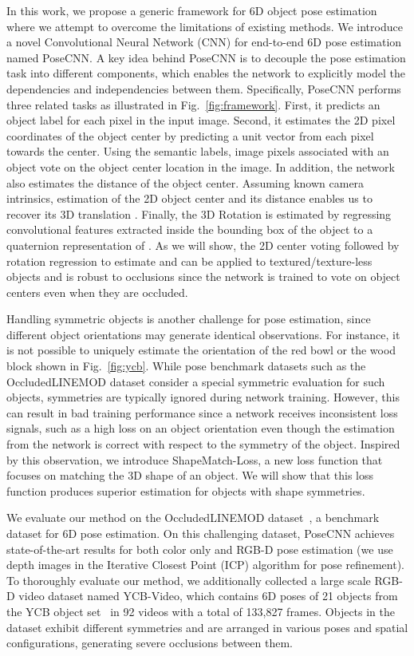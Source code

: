 \documentclass[conference]{IEEEtran}
\begin{document}
In this work, we propose a generic framework for 6D object pose estimation where we attempt to overcome the limitations of existing methods. We introduce a novel Convolutional Neural Network (CNN) for end-to-end 6D pose estimation named PoseCNN. A key idea behind PoseCNN is to decouple the pose estimation task into different components, which enables the network to explicitly model the dependencies and independencies between them. Specifically, PoseCNN performs three related tasks as illustrated in Fig.~\ref{fig:framework}. First, it predicts an object label for each pixel in the input image. Second, it estimates the 2D pixel coordinates of the object center by predicting a unit vector from each pixel towards the center. Using the semantic labels, image pixels associated with an object vote on the object center location in the image. In addition, the network also estimates the distance of the object center. Assuming known camera intrinsics, estimation of the 2D object center and its distance enables us to recover its 3D translation . Finally, the 3D Rotation  is estimated by regressing convolutional features extracted inside the bounding box of the object to a quaternion representation of . As we will show, the 2D center voting followed by rotation regression to estimate  and  can be applied to textured/texture-less objects and is robust to occlusions since the network is trained to vote on object centers even when they are occluded.

Handling symmetric objects is another challenge for pose estimation, since different object orientations may generate identical observations. For instance, it is not possible to uniquely estimate the orientation of the red bowl or the wood block shown in Fig.~\ref{fig:ycb}. While pose benchmark datasets such as the OccludedLINEMOD dataset \cite{krull2015learning} consider a special symmetric evaluation for such objects, symmetries are typically ignored during network training. However, this can result in bad training performance since a network receives inconsistent loss signals, such as a high loss on an object orientation even though the estimation from the network is correct with respect to the symmetry of the object. Inspired by this observation, we introduce ShapeMatch-Loss, a new loss function that focuses on matching the 3D shape of an object. We will show that this loss function produces superior estimation for objects with shape symmetries.

We evaluate our method on the OccludedLINEMOD dataset~\cite{krull2015learning}, a benchmark dataset for 6D pose estimation.  On this challenging dataset, PoseCNN achieves state-of-the-art results for both color only  and RGB-D pose estimation (we use depth images in the Iterative Closest Point (ICP) algorithm for pose refinement). To thoroughly evaluate our method, we additionally collected a large scale RGB-D video dataset named YCB-Video, which contains 6D poses of 21 objects from the YCB object set~\cite{calli2015ycb} in 92 videos with a total of 133,827 frames. Objects in the dataset exhibit different symmetries and are arranged in various poses and spatial configurations, generating severe occlusions between them.
\end{document}
